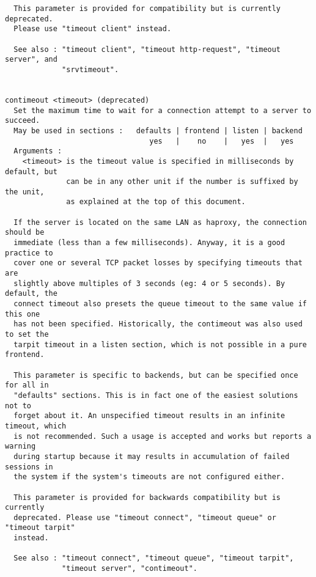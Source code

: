 \begin{verbatim}
  This parameter is provided for compatibility but is currently deprecated.
  Please use "timeout client" instead.

  See also : "timeout client", "timeout http-request", "timeout server", and
             "srvtimeout".


contimeout <timeout> (deprecated)
  Set the maximum time to wait for a connection attempt to a server to succeed.
  May be used in sections :   defaults | frontend | listen | backend
                                 yes   |    no    |   yes  |   yes
  Arguments :
    <timeout> is the timeout value is specified in milliseconds by default, but
              can be in any other unit if the number is suffixed by the unit,
              as explained at the top of this document.

  If the server is located on the same LAN as haproxy, the connection should be
  immediate (less than a few milliseconds). Anyway, it is a good practice to
  cover one or several TCP packet losses by specifying timeouts that are
  slightly above multiples of 3 seconds (eg: 4 or 5 seconds). By default, the
  connect timeout also presets the queue timeout to the same value if this one
  has not been specified. Historically, the contimeout was also used to set the
  tarpit timeout in a listen section, which is not possible in a pure frontend.

  This parameter is specific to backends, but can be specified once for all in
  "defaults" sections. This is in fact one of the easiest solutions not to
  forget about it. An unspecified timeout results in an infinite timeout, which
  is not recommended. Such a usage is accepted and works but reports a warning
  during startup because it may results in accumulation of failed sessions in
  the system if the system's timeouts are not configured either.

  This parameter is provided for backwards compatibility but is currently
  deprecated. Please use "timeout connect", "timeout queue" or "timeout tarpit"
  instead.

  See also : "timeout connect", "timeout queue", "timeout tarpit",
             "timeout server", "contimeout".



\end{verbatim}
